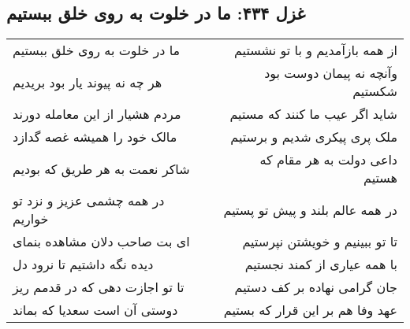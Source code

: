 \begin{center}
\section*{غزل ۴۳۴: ما در خلوت به روی خلق ببستیم}
\label{sec:434}
\begin{longtable}{l p{0.5cm} r}
ما در خلوت به روی خلق ببستیم
&&
از همه بازآمدیم و با تو نشستیم
\\
هر چه نه پیوند یار بود بریدیم
&&
وآنچه نه پیمان دوست بود شکستیم
\\
مردم هشیار از این معامله دورند
&&
شاید اگر عیب ما کنند که مستیم
\\
مالک خود را همیشه غصه گدازد
&&
ملک پری پیکری شدیم و برستیم
\\
شاکر نعمت به هر طریق که بودیم
&&
داعی دولت به هر مقام که هستیم
\\
در همه چشمی عزیز و نزد تو خواریم
&&
در همه عالم بلند و پیش تو پستیم
\\
ای بت صاحب دلان مشاهده بنمای
&&
تا تو ببینیم و خویشتن نپرستیم
\\
دیده نگه داشتیم تا نرود دل
&&
با همه عیاری از کمند نجستیم
\\
تا تو اجازت دهی که در قدمم ریز
&&
جان گرامی نهاده بر کف دستیم
\\
دوستی آن است سعدیا که بماند
&&
عهد وفا هم بر این قرار که بستیم
\\
\end{longtable}
\end{center}
